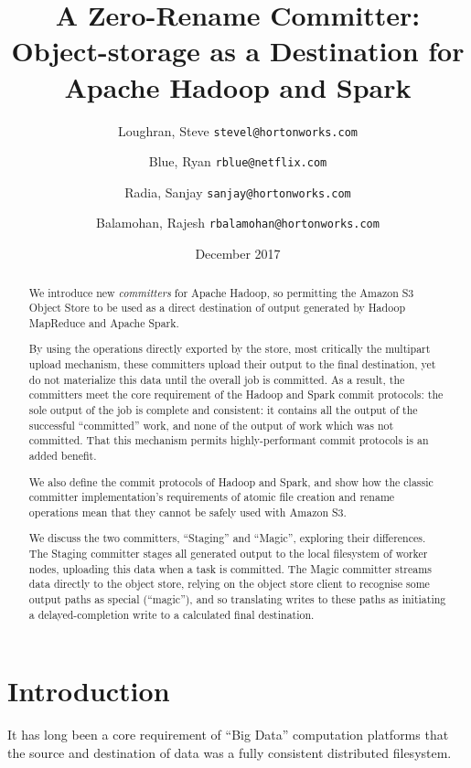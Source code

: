 \documentclass[conference]{IEEEtran}
\title{
A Zero-Rename Committer:\\
Object-storage as a Destination for Apache Hadoop and Spark}
\author{
  Loughran, Steve
  \texttt{stevel@hortonworks.com}\\
\and
  Blue, Ryan
  \texttt{rblue@netflix.com}\\
\and
  Radia, Sanjay
  \texttt{sanjay@hortonworks.com} \\
\and
  Balamohan, Rajesh
  \texttt{rbalamohan@hortonworks.com} \\
}
\date{December 2017}
\begin{document}
\maketitle


\begin{abstract}

We introduce new \emph{committers} for Apache Hadoop, so permitting
the Amazon S3 Object Store to be used as a direct destination of output generated
by Hadoop MapReduce and Apache Spark.

By using the operations directly exported by the store,
most critically the multipart upload mechanism, these committers upload
their output to the final destination, yet do not materialize this data until the
overall job is committed.
As a result, the committers meet the core requirement of the Hadoop and Spark commit
protocols: the sole output of the job is complete and consistent: it contains
all the output of the successful ``committed'' work, and none of the output of
work which was not committed.
That this mechanism permits highly-performant commit protocols is an added benefit.

We also define the commit protocols of Hadoop and Spark, and show how the classic committer
implementation's requirements of atomic file creation and rename operations mean that they
cannot be safely used with Amazon S3.

We discuss the two committers, ``Staging'' and ``Magic'', exploring their differences.
The Staging committer stages all generated output to the local filesystem of
worker nodes, uploading this data when a task is committed.
The Magic committer streams data directly to the object store, relying on the
object store client to recognise some output paths as special (``magic''), and
so translating writes to these paths as initiating a delayed-completion write
to a calculated final destination.

\end{abstract}


\section{Introduction}
\label{sec:introduction}

It has long been a core requirement of ``Big Data'' computation platforms that
the source and destination of data was a fully consistent distributed filesystem.
\end{document}
